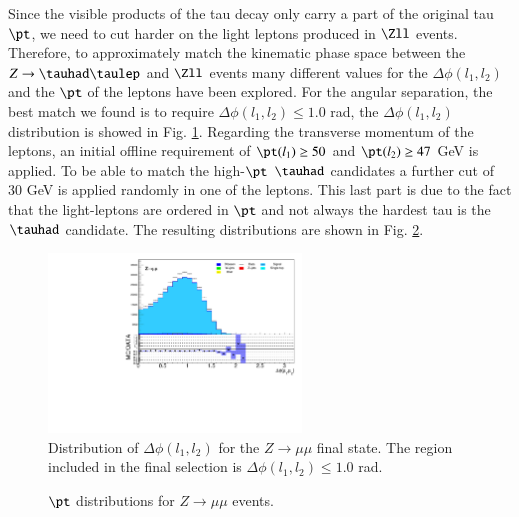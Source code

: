 Since the visible products of the tau decay only carry a part of the original tau $\pt$, we need to cut harder on the light leptons produced in $\Zll$ events. Therefore, to approximately match the kinematic phase space between the $Z\to\tauhad\taulep$ and $\Zll$ events many different values for the $\Delta\phi (l_1,l_2)$ and the $\pt$ of the leptons have been explored. For the angular separation, the best match we found is to require $\Delta\phi (l_1,l_2)\leq 1.0$ rad, the $\Delta\phi (l_1,l_2)$ distribution is showed in Fig. \ref{Fig8s}. Regarding the transverse momentum of the leptons, an initial offline requirement of $\pt(l_1)\geq 50$ and $\pt(l_2)\geq 47$ GeV is applied. To be able to match the high-$\pt$ $\tauhad$ candidates a further cut of 30 GeV is applied randomly in one of the leptons. This last part is due to the fact that the light-leptons are ordered in $\pt$ and not always the hardest tau is the $\tauhad$ candidate. The resulting distributions are shown in Fig. \ref{Fig9}.
\begin{figure}[htbp]	
	\centering
	\includegraphics[width=0.6\textwidth]{figures/Fig8.pdf}
	\caption{Distribution of $\Delta\phi (l_1,l_2)$ for the $Z\to\mu\mu$ final state. The region included in the final selection is $\Delta\phi (l_1,l_2)\leq 1.0$ rad.}
	\label{Fig8s}
\end{figure}
\begin{figure}[htbp]
	\centering
	\hfill
	\caption{$\pt$ distributions for $Z\to\mu\mu$ events.}
	\label{Fig9}
\end{figure}

